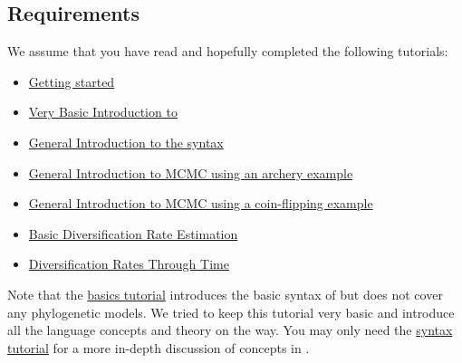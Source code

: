 \subsection{Requirements}
We assume that you have read and hopefully completed the following tutorials:
\begin{itemize}
\item \href{https://github.com/revbayes/revbayes_tutorial/raw/master/tutorial_TeX/RB_Getting_Started/RB_Getting_Started.pdf}{Getting started}
\item \href{https://github.com/revbayes/revbayes_tutorial/raw/master/tutorial_TeX/RB_Intro_Tutorial/RB_Intro_Tutorial.pdf}{Very Basic Introduction to \Rev}
\item \href{https://github.com/revbayes/revbayes_tutorial/raw/master/tutorial_TeX/RB_Rev_Tutorial/RB_Rev_Tutorial.pdf}{General Introduction to the \Rev syntax}
\item \href{https://github.com/revbayes/revbayes_tutorial/raw/master/tutorial_TeX/RB_MCMC_Archery_Tutorial/RB_MCMC_Archery_Tutorial.pdf}{General Introduction to MCMC using an archery example}
\item \href{https://github.com/revbayes/revbayes_tutorial/raw/master/tutorial_TeX/RB_MCMC_Binomial_Tutorial/RB_MCMC_Binomial_Tutorial.pdf}{General Introduction to MCMC using a coin-flipping example}
\item \href{https://github.com/revbayes/revbayes_tutorial/raw/master/tutorial_TeX/RB_DiversificationRate_Tutorial/RB_DiversificationRate_Tutorial.pdf}{Basic Diversification Rate Estimation}
\item \href{https://github.com/revbayes/revbayes_tutorial/raw/master/tutorial_TeX/RB_DiversificationRate_Episodic_Tutorial/RB_DiversificationRate_Episodic_Tutorial.pdf}{Diversification Rates Through Time}
\end{itemize}
Note that the \href{https://github.com/revbayes/revbayes_tutorial/raw/master/tutorial_TeX/RB_Intro_Tutorial/RB_Intro_Tutorial.pdf}{\Rev basics tutorial} introduces the basic syntax of \Rev but does not cover any phylogenetic models.
We tried to keep this tutorial very basic and introduce all the language concepts and theory on the way.
You may only need the \href{https://github.com/revbayes/revbayes_tutorial/raw/master/tutorial_TeX/RB_Rev_Tutorial/RB_Rev_Tutorial.pdf}{\Rev syntax tutorial} for a more in-depth discussion of concepts in \Rev.


